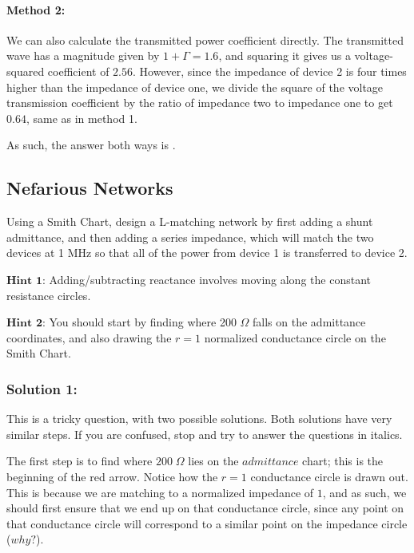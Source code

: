 \documentclass{article}
\begin{document}
\paragraph{Method 2:} We can also calculate the transmitted power coefficient directly. The transmitted wave has a magnitude given by $1 + \Gamma = 1.6$, and squaring it gives us a voltage-squared coefficient of $2.56$. However, since the impedance of device 2 is four times higher than the impedance of device one, we divide the square of the voltage transmission coefficient by the ratio of impedance two to impedance one to get $0.64$, same as in method 1.

\vspace{3mm}

As such, the answer both ways is .


\vfill

\subsection{Nefarious Networks}
Using a Smith Chart, design a L-matching network by first adding a shunt admittance, and then adding a series impedance, which will match the two devices at 1 MHz so that all of the power from device 1 is transferred to device 2. 
\vspace{3mm}

$\textbf{Hint 1:}$ Adding/subtracting reactance involves moving along the constant resistance circles.


\vspace{3mm}

$\textbf{Hint 2:}$ You should start by finding where 200 $\Omega$ falls on the admittance coordinates, and also drawing the $r = 1$ normalized conductance circle on the Smith Chart.

\subsubsection{Solution 1:}

This is a tricky question, with two possible solutions. Both solutions have very similar steps. If you are confused, stop and try to answer the questions in italics.

\vspace{3mm}

The first step is to find where $200 \;\Omega$ lies on the $admittance$ chart; this is the beginning of the red arrow. Notice how the $r=1$ conductance circle is drawn out. This is because we are matching to a normalized impedance of $1$, and as such, we should first ensure that we end up on that conductance circle, since any point on that conductance circle will correspond to a similar point on the impedance circle ($why?$). 
\end{document}
